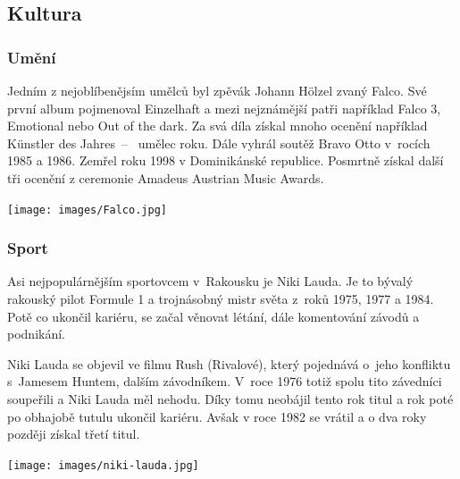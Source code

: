 \documentclass[a2 paper]{article}
\begin{document}
\begin{landscape}
\begin{minipage}[H]{\linewidth}
	\subsection*{Kultura}
	\begin{minipage}[t]{0.45 \linewidth}
		\begin{minipage}[t]{0.75\linewidth}
			\subsubsection*{Umění}
			Jedním z nejoblíbenějsím umělců byl zpěvák Johann Hölzel zvaný Falco. Své první album pojmenoval Einzelhaft a mezi nejznámější patři například Falco 3, Emotional nebo Out of the dark. Za svá díla získal mnoho ocenění například Künstler des Jahres~-- ~umělec roku. Dále vyhrál soutěž Bravo Otto v~rocích 1985 a 1986. Zemřel roku 1998 v Dominikánské republice. Posmrtně získal další tři ocenění z ceremonie Amadeus Austrian Music Awards.
		\end{minipage}
	\begin{minipage}[t]{0.2\linewidth}
		\centering
		\texttt{[image: images/Falco.jpg]}
	\end{minipage}
	\end{minipage}
	\begin{minipage}[t]{0.45 \linewidth}
		\begin{minipage}[t]{0.75 \linewidth}
			\subsubsection*{Sport}
			Asi nejpopulárnějším sportovcem v~Rakousku je Niki Lauda. Je to bývalý rakouský pilot Formule 1 a trojnásobný mistr světa z~roků 1975, 1977 a 1984. Potě co ukončil kariéru, se začal věnovat létání, dále komentování závodů a podnikání. \par
			Niki Lauda se objevil ve filmu Rush (Rivalové), který pojednává o~jeho konfliktu s~Jamesem Huntem, dalším závodníkem. V~roce 1976 totiž spolu tito závedníci soupeřili a Niki Lauda měl nehodu. Díky tomu neobájil tento rok titul a rok poté po obhajobě tutulu ukončil kariéru. Avšak v roce 1982 se vrátil a o dva roky později získal třetí titul.
		\end{minipage}
		\begin{minipage}[t]{0.2 \linewidth}
			\centering
			\texttt{[image: images/niki-lauda.jpg]}
		\end{minipage}
	\end{minipage}
\end{minipage}
\end{landscape}
\end{document}

